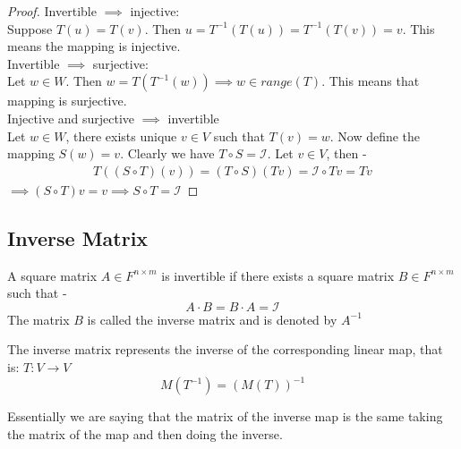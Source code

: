 \begin{proof}
	Invertible $\implies$ injective: \\
	Suppose $T(u) = T(v)$. Then $u = T^{-1}(T(u)) = T^{-1}(T(v)) = v$. This means the mapping is injective. \\
	Invertible $\implies$ surjective: \\
	Let $w \in W$. Then $w = T(T^{-1}(w)) \implies w \in range(T)$. This means that mapping is surjective. \\ 
	 Injective and surjective $\implies$ invertible \\ 
	 Let $w \in W$, there exists unique $v \in V$ such that $T(v) = w$. Now define the mapping $S(w) = v$. Clearly we have $T \circ S = \mathcal{I}$. Let $v \in V$, then -  
	 \begin{align*}
	 T((S \circ T)(v)) = (T \circ S)(Tv) = \mathcal{I} \circ Tv = Tv
	 \end{align*}
	 $\implies (S \circ T)v = v \implies S \circ T = \mathcal{I}$
\end{proof}

\subsection{Inverse Matrix}

\begin{definition}
	A square matrix $A \in F^{n \times m}$ is invertible if there exists a square matrix $B \in F^{n \times m}$ such that - 
	\begin{equation*}
		A \cdot B = B \cdot A = \mathcal{I}
	\end{equation*}
	The matrix $B$ is called the inverse matrix and is denoted by $A^{-1}$
\end{definition}

\begin{proposition}
	The inverse matrix represents the inverse of the corresponding linear map, that is: $T: V \rightarrow V$ 
	\begin{equation*}
		M(T^{-1}) = (M(T))^{-1}
	\end{equation*}
\end{proposition}

Essentially we are saying that the matrix of the inverse map is the same taking the matrix of the map and then doing the inverse.



